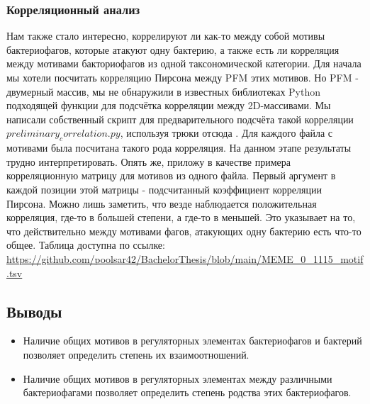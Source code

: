 \documentclass[14pt]{extarticle}
\begin{document}
    \begin{center}
        \item \subsubsection{Корреляционный анализ}
    \end{center}

    \par{Нам также стало интересно, коррелируют ли как-то между собой мотивы бактериофагов, которые атакуют одну 
    бактерию, а также есть ли корреляция между мотивами бакториофагов из одной таксономической категории. Для начала мы 
    хотели посчитать корреляцию Пирсона между PFM этих мотивов. Но PFM - двумерный массив, мы не обнаружили в известных 
    библиотеках Python подходящей функции для подсчётка корреляции между 2D-массивами. Мы написали собственный скрипт 
    для предварительного подсчёта такой корреляции $preliminary_correlation.py$, используя трюки отсюда 
    \cite{stackoverflow}. Для каждого файла с мотивами была посчитана такого рода корреляция. На данном этапе 
    результаты трудно интерпретировать. Опять же, приложу в качестве примера корреляционную матрицу для мотивов из 
    одного файла. Первый аргумент в каждой позиции этой матрицы - подсчитанный коэффициент корреляции Пирсона. Можно 
    лишь заметить, что везде наблюдается положительная корреляция, где-то в большей степени, а где-то в меньшей. Это 
    указывает на то, что действительно между мотивами фагов, атакующих одну бактерию есть что-то общее. Таблица доступна
    по ссылке: \url{https://github.com/poolsar42/BachelorThesis/blob/main/MEME_0_1115_motif.tsv}}
    
    \newpage
    \begin{center}
    \item  \section{Выводы}
    \end{center}
    
    \begin{itemize}
        \item Наличие общих мотивов в регуляторных элементах бактериофагов и бактерий позволяет определить степень их 
        взаимоотношений.
        \item Наличие общих мотивов в регуляторных элементах между различными бактериофагами позволяет определить 
        степень родства этих бактериофагов.
    \end{itemize}
    
\end{document}
